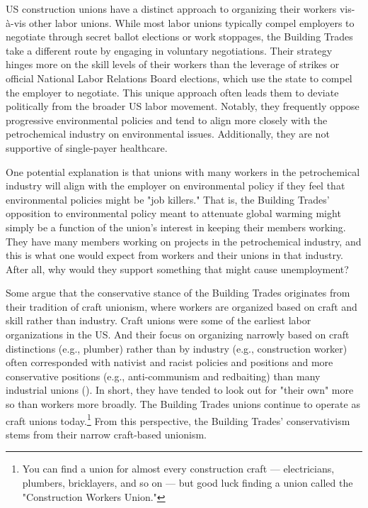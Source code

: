 \documentclass[12pt]{article}
\begin{document}

US construction unions have a distinct approach to organizing their workers vis-à-vis other labor unions. While most labor unions typically compel employers to negotiate through secret ballot elections or work stoppages, the Building Trades take a different route by engaging in voluntary negotiations. Their strategy hinges more on the skill levels of their workers than the leverage of strikes or official National Labor Relations Board elections, which use the state to compel the employer to negotiate. This unique approach often leads them to deviate politically from the broader US labor movement. Notably, they frequently oppose progressive environmental policies and tend to align more closely with the petrochemical industry on environmental issues. Additionally, they are not supportive of single-payer healthcare.

One potential explanation is that unions with many workers in the petrochemical industry will align with the employer on environmental policy if they feel that environmental policies might be "job killers." That is, the Building Trades' opposition to environmental policy meant to attenuate global warming might simply be a function of the union's interest in keeping their members working. They have many members working on projects in the petrochemical industry, and this is what one would expect from workers and their unions in that industry. After all, why would they support something that might cause unemployment?

Some argue that the conservative stance of the Building Trades originates from their tradition of craft unionism, where workers are organized based on craft and skill rather than industry. Craft unions were some of the earliest labor organizations in the US. And their focus on organizing narrowly based on craft distinctions (e.g., plumber) rather than by industry (e.g., construction worker) often corresponded with nativist and racist policies and positions and more conservative positions (e.g., anti-communism and redbaiting) than many industrial unions (\cite{foner1994}). In short, they have tended to look out for "their own" more so than workers more broadly. The Building Trades unions continue to operate as craft unions today.\footnote{You can find a union for almost every construction craft --- electricians, plumbers, bricklayers, and so on --- but good luck finding a union called the "Construction Workers Union."} From this perspective, the Building Trades' conservativism stems from their narrow craft-based unionism.
\end{document}
